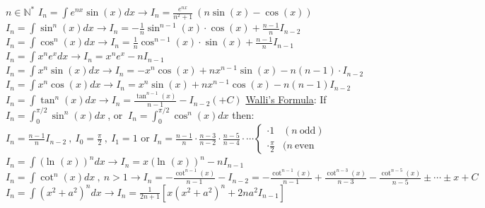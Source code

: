 \documentclass[12pt]{article}
\def\ln{\text{ln\ }} %
\begin{document}
\begin{flushleft}
	$n \in \mathbb{N}^* $ \linebreak 
	\textbullet \quad $\displaystyle I_n = \int e^{nx} \sin (x) dx \rightarrow I_n = \frac{e^{nx}}{n^2+1} \ \left(n \sin (x) - \cos (x) \right)	 $ \linebreak 
	\textbullet \quad $\displaystyle I_n = \int \sin ^n(x) dx \rightarrow I_n = - \frac{1}{n} \sin ^{n-1} (x) \cdot \cos (x) + \frac{n-1}{n} I_{n-2} $ \linebreak 
	\textbullet \quad $\displaystyle I_n = \int \cos ^n(x) dx \rightarrow I_n = \frac{1}{n} \cos ^{n-1} (x) \cdot \sin (x) + \frac{n-1}{n} I_{n-1} $ \linebreak 
	\textbullet \quad $\displaystyle I_n = \int x^n e^x dx \rightarrow I_n = x^n e^x - n I_{n-1} $ \linebreak 
	\textbullet \quad $\displaystyle I_n = \int x^n \sin (x) dx \rightarrow I_n = -x^n \cos (x) + nx^{n-1} \sin (x) -n(n-1) \cdot I_{n-2} $ \linebreak 
	\textbullet \quad $\displaystyle I_n = \int x^n \cos (x) dx \rightarrow I_n = x^n \sin (x) + nx^{n-1} \cos (x) -n(n-1) I_{n-2} $ \linebreak 
	\textbullet \quad $\displaystyle I_n = \int \tan^n(x) dx \rightarrow I_n = \frac{\tan^{n-1}(x)}{n-1} - I_{n-2} (+C) $ \linebreak 
	\textbullet \quad \uline{Walli's Formula}: If $\displaystyle  I_n = \int_0^{\pi / 2} \sin ^n(x) dx\ $, or $\ I_n = \int_0^{\pi / 2} \cos ^n(x) dx $ then: $\displaystyle I_n = \frac{n-1}{n} I_{n-2} \ , \ I_0 = \frac{\pi}{2} \ , \ I_1 = 1 $ \linebreak 
	or $\displaystyle I_n = \frac{n-1}{n} \cdot \frac{n-3}{n-2} \cdot \frac{n-5}{n-4}  \cdot \cdots \begin{cases} \cdot 1 & (n\ \text{odd}) \\ 
																																						 \cdot \frac{\pi}{2} & (n \ \text{even} \end{cases} $ \linebreak 
	\textbullet \quad $\displaystyle I_n = \int \left(\ln(x) \right)^n dx \rightarrow I_n = x \left( \ln(x) \right)^n - nI_{n-1} $ \linebreak 
	\textbullet \quad $\displaystyle I_n = \int \cot ^n(x) dx\ , \ n>1 \rightarrow I_n = - \frac{\cot ^{n-1}(x)}{n-1} - I_{n-2}  = -\frac{\cot ^{n-1}(x)}{n-1} + \frac{\cot ^{n-3}(x)}{n-3} - \frac{\cot ^{n-5}(x)}{n-5} \pm \cdots \pm x + C$ \linebreak 
	\textbullet \quad $\displaystyle I_n = \int \left( x^2 + a^2 \right)^n dx \rightarrow I_n = \frac{1}{2n+1} \left[ x(x^2 + a^2)^n +2na^2 I_{n-1} \right] $ \linebreak 

\end{flushleft}
\end{document}
